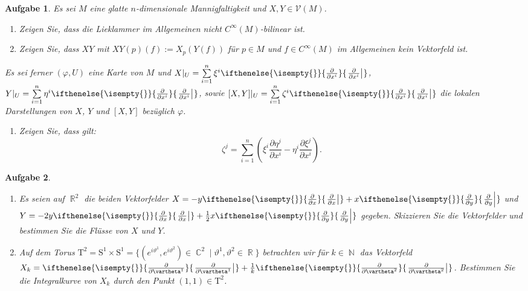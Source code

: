 \documentclass[paper=A4, twoside, chapterprefix=true, bibliography=totoc, headsepline]{scrbook}
\let\temp\phi
\let\phi\varphi
\let\varphi\temp
\let\temp\theta
\let\theta\vartheta
\let\vartheta\temp
\let\temp\epsilon
\let\epsilon\varepsilon
\let\varepsilon\temp
\let\temp\rho
\let\rho\varrho
\let\varrho\temp
\DeclareMathOperator{\C}{\mathbb{C}}
\DeclareMathOperator{\N}{\mathbb{N}}
\DeclareMathOperator{\R}{\mathbb{R}}
\newcommand{\pdifffrac}[3][]{\ifthenelse{\isempty{#1}}{\frac{\partial #2}{\partial #3}}{\left. \frac{\partial #2}{\partial #3} \right|_{#1}}}
\theoremstyle{plain}
\theoremstyle{nonumberplain}
\theoremstyle{empty}
\theoremstyle{break}
\newtheorem{Aufg}{Aufgabe}
\begin{document}
\begin{Aufg}
Es sei $M$ eine glatte $n$-dimensionale Mannigfaltigkeit und $X,Y \in \mathcal{V}(M)$.
\begin{enumerate}[label=\alph*),leftmargin=*,widest=b]
\item
	Zeigen Sie, dass die Lieklammer im Allgemeinen nicht $C^{\infty}(M)$-bilinear ist.
\item
	Zeigen Sie, dass $XY$ mit $XY(p)(f):=X_p(Y(f))$ für $p \in M$ und $f\in C^\infty(M)$ im Allgemeinen kein Vektorfeld ist.
\end{enumerate}
Es sei ferner $(\phi,U)$  eine Karte von $M$ und $X|_U=\sum\limits_{i=1}^n \xi^i \pdifffrac{}{x^i}$, $Y|_U=\sum\limits_{i=1}^n \eta^i \pdifffrac{}{x^i}$, sowie $[X,Y]|_U=\sum\limits_{i=1}^n \zeta^i \pdifffrac{}{x^i}$ die lokalen Darstellungen von $X$, $Y$ und $[X,Y]$ bezüglich $\phi$.
\begin{enumerate}[label=\alph*),leftmargin=*,widest=b]
\item[c)]
	Zeigen Sie, dass gilt: 
		\[\zeta^j=\sum_{i=1}^n \left(\xi^i \frac{\partial \eta^j}{\partial x^i} - \eta^i \frac{\partial \xi^j}{\partial x^i}\right).\]
\end{enumerate}\end{Aufg}

\begin{Aufg}\begin{enumerate}[label=\alph*),leftmargin=*,widest=b]
\item
	Es seien auf $\R^2$ die beiden Vektorfelder $X=-y \pdifffrac{}{x}+x \pdifffrac{}{y}$ und $Y=-2 y \pdifffrac{}{x}+\tfrac{1}{2} x \pdifffrac{}{y}$ gegeben. Skizzieren Sie die Vektorfelder und bestimmen Sie die Flüsse von $X$ und $Y$.
\item
	Auf dem Torus $\mathrm{T}^2=\mathrm{S}^1 \times \mathrm{S}^1=\{(e^{i \theta^1}, e^{i \theta^2})\in \C^2 \mid \theta^1, \theta^2 \in \R\}$ betrachten wir für $k \in \N$  das Vektorfeld $X_k=\pdifffrac{}{\theta^1}+ \tfrac{1}{k}\pdifffrac{}{\theta^2}$. Bestimmen Sie die Integralkurve von $X_k$ durch den Punkt $(1,1) \in \mathrm{T}^2$.
\end{enumerate}\end{Aufg}
\end{document}
